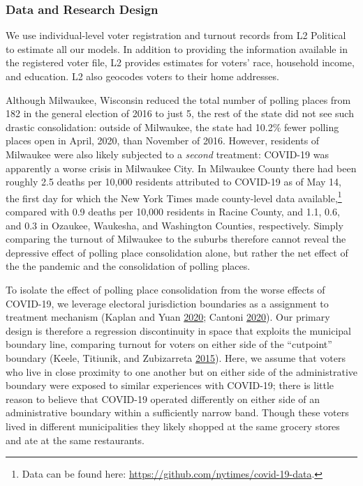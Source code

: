 \documentclass[
  12pt,
]{article}
\begin{document}
\hypertarget{data-and-research-design}{%
\subsubsection*{Data and Research Design}\label{data-and-research-design}}

We use individual-level voter registration and turnout records from L2 Political to estimate all our models. In addition to providing the information available in the registered voter file, L2 provides estimates for voters' race, household income, and education. L2 also geocodes voters to their home addresses.

Although Milwaukee, Wisconsin reduced the total number of polling places from 182 in the general election of 2016 to just 5, the rest of the state did not see such drastic consolidation: outside of Milwaukee, the state had 10.2\% fewer polling places open in April, 2020, than November of 2016. However, residents of Milwaukee were also likely subjected to a \emph{second} treatment: COVID-19 was apparently a worse crisis in Milwaukee City. In Milwaukee County there had been roughly 2.5 deaths per 10,000 residents attributed to COVID-19 as of May 14, the first day for which the New York Times made county-level data available,\footnote{Data can be found here: \url{https://github.com/nytimes/covid-19-data}.} compared with 0.9 deaths per 10,000 residents in Racine County, and 1.1, 0.6, and 0.3 in Ozaukee, Waukesha, and Washington Counties, respectively. Simply comparing the turnout of Milwaukee to the suburbs therefore cannot reveal the depressive effect of polling place consolidation alone, but rather the net effect of the the pandemic and the consolidation of polling places.

To isolate the effect of polling place consolidation from the worse effects of COVID-19, we leverage electoral jurisdiction boundaries as a assignment to treatment mechanism (Kaplan and Yuan \protect\hyperlink{ref-Kaplan2020}{2020}; Cantoni \protect\hyperlink{ref-Cantoni2020}{2020}). Our primary design is therefore a regression discontinuity in space that exploits the municipal boundary line, comparing turnout for voters on either side of the ``cutpoint'' boundary (Keele, Titiunik, and Zubizarreta \protect\hyperlink{ref-Keele2015}{2015}). Here, we assume that voters who live in close proximity to one another but on either side of the administrative boundary were exposed to similar experiences with COVID-19; there is little reason to believe that COVID-19 operated differently on either side of an administrative boundary within a sufficiently narrow band. Though these voters lived in different municipalities they likely shopped at the same grocery stores and ate at the same restaurants.
\end{document}
